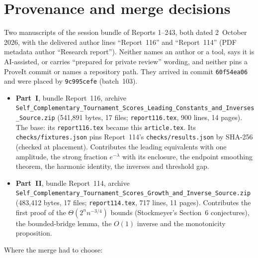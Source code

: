 \documentclass[11pt,letterpaper]{article}
\newcommand{\file}[1]{\nolinkurl{#1}}
\theoremstyle{definition}\newtheorem{remark}[theorem]{Remark}
\begin{document}
\section*{Provenance and merge decisions}\label{sct:sec:provenance}
Two manuscripts of the session bundle of Reports 1--243, both dated 2~October 2026, with the delivered author lines ``Report~116'' and ``Report~114'' (PDF metadata author ``Research report''). Neither names an author or a tool, says it is AI-assisted, or carries ``prepared for private review'' wording, and neither pins a ProveIt commit or names a repository path. They arrived in commit \texttt{60f54ea06} and were placed by \texttt{9c995cefe} (batch~103).
\begin{itemize}
\item \textbf{Part~I}, bundle Report~116, archive \file{Self_Complementary_Tournament_Scores_Leading_Constants_and_Inverses_Source.zip} (541{,}891 bytes, 17 files; \file{report116.tex}, 900 lines, 14 pages). The base: its \file{report116.tex} became this \file{article.tex}. Its \file{checks/fixtures.json} pins Report~114's \file{checks/results.json} by SHA-256 (checked at placement). Contributes the leading equivalents with one amplitude, the strong fraction $e^{-\lambda}$ with its enclosure, the endpoint smoothing theorem, the harmonic identity, the inverses and threshold gap.
\item \textbf{Part~II}, bundle Report~114, archive \file{Self_Complementary_Tournament_Scores_Growth_and_Inverse_Source.zip} (483{,}412 bytes, 17 files; \file{report114.tex}, 717 lines, 11 pages). Contributes the first proof of the $\Theta(2^nn^{-3/4})$ bounds (Stockmeyer's Section~6 conjectures), the bounded-bridge lemma, the $O(1)$ inverse and the monotonicity proposition.
\end{itemize}
Where the merge had to choose:
\end{document}
